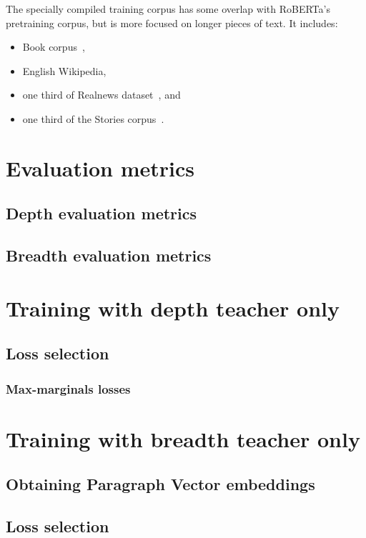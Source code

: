 The specially compiled training corpus has some overlap with RoBERTa's
pretraining corpus, but is more focused on longer pieces of text. It includes:

\begin{itemize}
  \item Book corpus~\cite{zhu2015aligning},
  \item English Wikipedia,
  \item one third of Realnews dataset~\cite{zellers2019defending}, and
  \item one third of the Stories corpus~\cite{trinh2018simple}.
\end{itemize}

\section{Evaluation metrics}

\subsection{Depth evaluation metrics}
\subsection{Breadth evaluation metrics}

\section{Training with depth teacher only}
\subsection{Loss selection}
\subsubsection{Max-marginals losses}

\section{Training with breadth teacher only}
\subsection{Obtaining Paragraph Vector embeddings}
\subsection{Loss selection}
